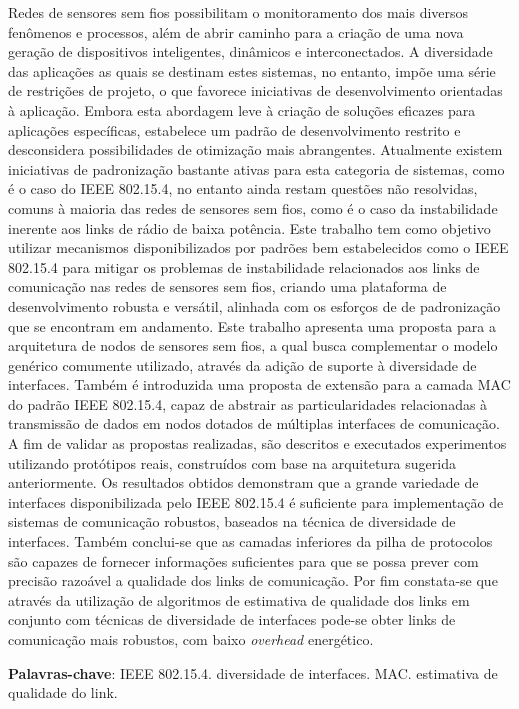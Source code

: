 \documentclass[
	12pt,				%
	openright,			%
	oneside,
	a4paper,			%
	english,			%
	french,				%
	spanish,			%
	brazil				%
	]{abntex2}
\begin{document}
\setlength{\absparsep}{18pt} %
\begin{resumo}
 
 Redes de sensores sem fios possibilitam o monitoramento dos mais diversos fenômenos e processos, além de abrir caminho para a criação de uma nova geração de dispositivos inteligentes, dinâmicos e interconectados. A diversidade das aplicações as quais se destinam estes sistemas, no entanto, impõe uma série de restrições de projeto, o que favorece iniciativas de desenvolvimento orientadas à aplicação. Embora esta abordagem leve à criação de soluções eficazes para aplicações específicas, estabelece um padrão de desenvolvimento restrito e desconsidera possibilidades de otimização mais abrangentes. Atualmente existem iniciativas de padronização bastante ativas para esta categoria de sistemas, como é o caso do IEEE 802.15.4, no entanto ainda restam questões não resolvidas, comuns à maioria das redes de sensores sem fios, como é o caso da instabilidade inerente aos links de rádio de baixa potência. Este trabalho tem como objetivo utilizar mecanismos disponibilizados por padrões bem estabelecidos como o IEEE 802.15.4 para mitigar os problemas de instabilidade relacionados aos links de comunicação nas redes de sensores sem fios, criando uma plataforma de desenvolvimento robusta e versátil, alinhada com os esforços de de padronização que se encontram em andamento. Este trabalho apresenta uma proposta para a arquitetura de nodos de sensores sem fios, a qual busca complementar o modelo genérico comumente utilizado, através da adição de suporte à diversidade de interfaces. Também é introduzida uma proposta de extensão para a camada MAC do padrão IEEE 802.15.4, capaz de abstrair as particularidades relacionadas à transmissão de dados em nodos dotados de múltiplas interfaces de comunicação. A fim de validar as propostas realizadas, são descritos e executados experimentos utilizando protótipos reais, construídos com base na arquitetura sugerida anteriormente. Os resultados obtidos demonstram que a grande variedade de interfaces disponibilizada pelo IEEE 802.15.4 é suficiente para implementação de sistemas de comunicação robustos, baseados na técnica de diversidade de interfaces. Também conclui-se que as camadas inferiores da pilha de protocolos são capazes de fornecer informações suficientes para que se possa prever com precisão razoável a qualidade dos links de comunicação. Por fim constata-se que através da utilização de algoritmos de estimativa de qualidade dos links em conjunto com técnicas de diversidade de interfaces pode-se obter links de comunicação mais robustos, com baixo \textit{overhead} energético.
 
  

 \textbf{Palavras-chave}: IEEE 802.15.4. diversidade de interfaces. MAC. estimativa de qualidade do link.
\end{resumo}
\end{document}
